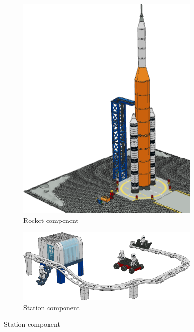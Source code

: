 \documentclass{PDS}
\begin{document}
\begin{figure}[htbp]
    \centering
    \begin{subfigure}[b]{0.25\textwidth}
        \includegraphics[width=\textwidth]{./figures/space_rocket.png}
        \caption{Rocket component}
    \end{subfigure}
    \hfill
    \begin{subfigure}[b]{0.45\textwidth}
        \includegraphics[width=\textwidth]{./figures/space_station.png}
        \caption{Station component}
    \end{subfigure}

\end{figure}
\end{document}

